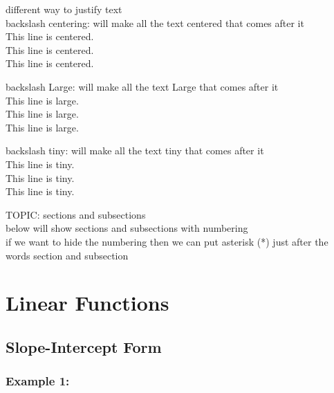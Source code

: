 \documentclass[11pt]{article}
\begin{document}
\vspace{1cm}

different way to justify text\\
backslash centering: will make all the text centered that comes after it\\

\centering
This line is centered.\\
This line is centered.\\
This line is centered.\\

\vspace{1cm}

backslash Large: will make all the text Large that comes after it\\

\Large
This line is large.\\
This line is large.\\
This line is large.\\

\vspace{1cm}

backslash tiny: will make all the text tiny that comes after it\\

\tiny
This line is tiny.\\
This line is tiny.\\
This line is tiny.\\

\vspace{1cm}

\normalsize
\raggedright

TOPIC: sections and subsections\\
below will show sections and subsections with numbering\\
if we want to hide the numbering then we can put asterisk (*) just after the words section and subsection\\

\section{Linear Functions}
  \subsection{Slope-Intercept Form}
    \subsubsection{Example 1:}
\end{document}
